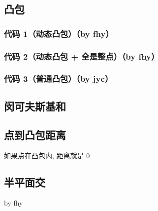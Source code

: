 \documentclass[12pt]{article}
\begin{document}


\newpage

\subsection{凸包}

\subsubsection{代码 1（动态凸包）（by fhy）}



\newpage

\subsubsection{代码 2（动态凸包 + 全是整点）（by fhy）}



\newpage

\subsubsection{代码 3（普通凸包）（by jyc）}



\newpage

\subsection{闵可夫斯基和}



\subsection{点到凸包距离}

如果点在凸包内, 距离就是 0



\newpage

\subsection{半平面交}

by fhy
\end{document}
